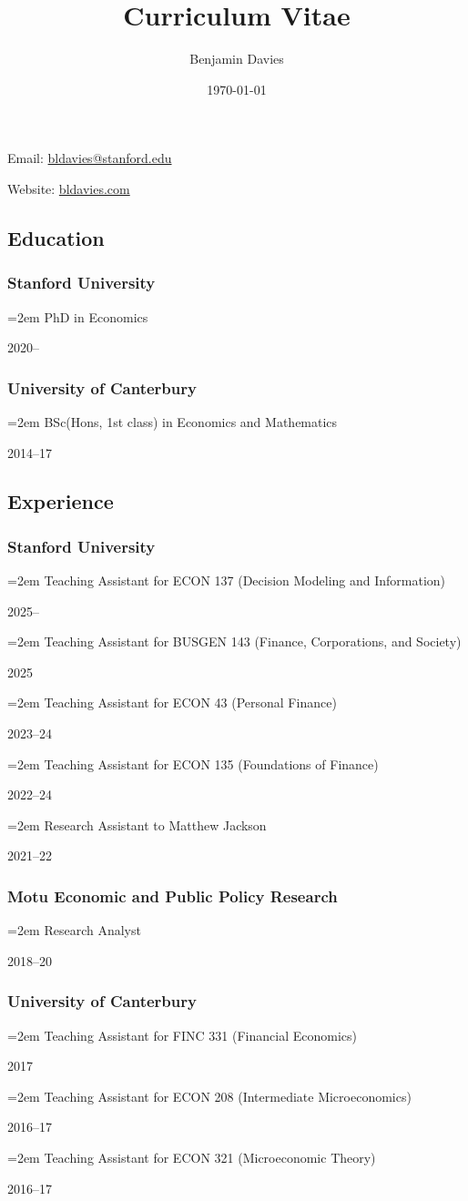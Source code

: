 \documentclass[11pt,oneside]{memoir}
\title{Curriculum Vitae}
\author{Benjamin Davies}
\date{\today}
\newcommand{\entry}[2]{\par\parbox[t]{0.9\linewidth}{\strut\raggedright\hangindent=2em #2\strut}\hfill#1}
\begin{document}
\chapter{\theauthor}

Email: \href{mailto:bldavies@stanford.edu}{bldavies@stanford.edu}

Website: \href{https://bldavies.com}{bldavies.com}

\section{Education}

\subsection{Stanford University}
\entry{2020--}{PhD in Economics}

\subsection{University of Canterbury}
\entry{2014--17}{BSc(Hons, 1st class) in Economics and Mathematics}

\section{Experience}

\subsection{Stanford University}
\entry{2025--}{Teaching Assistant for ECON 137 (Decision Modeling and Information)}
\entry{2025}{Teaching Assistant for BUSGEN 143 (Finance, Corporations, and Society)}
\entry{2023--24}{Teaching Assistant for ECON 43 (Personal Finance)}
\entry{2022--24}{Teaching Assistant for ECON 135 (Foundations of Finance)}
\entry{2021--22}{Research Assistant to Matthew Jackson}

\subsection{Motu Economic and Public Policy Research}
\entry{2018--20}{Research Analyst}

\subsection{University of Canterbury}
\entry{2017}{Teaching Assistant for FINC 331 (Financial Economics)}
\entry{2016--17}{Teaching Assistant for ECON 208 (Intermediate Microeconomics)}
\entry{2016--17}{Teaching Assistant for ECON 321 (Microeconomic Theory)}
\end{document}
